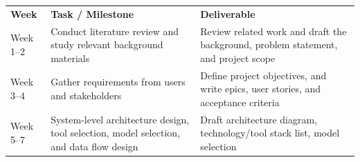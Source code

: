 \documentclass[12pt]{article}
\begin{document}
{\def\LTcaptype{none} %
\begin{longtable}[]{@{}
  >{\raggedright\arraybackslash}p{}
  >{\raggedright\arraybackslash}p{}
  >{\raggedright\arraybackslash}p{}@{}}
\toprule\noalign{}
\begin{minipage}[b]{\linewidth}\centering
\textbf{Week}
\end{minipage} & \begin{minipage}[b]{\linewidth}\centering
\textbf{Task / Milestone}
\end{minipage} & \begin{minipage}[b]{\linewidth}\centering
\textbf{Deliverable}
\end{minipage} \\
\begin{minipage}[b]{\linewidth}\centering
Week 1--2
\end{minipage} & \begin{minipage}[b]{\linewidth}\centering
Conduct literature review and study relevant background materials
\end{minipage} & \begin{minipage}[b]{\linewidth}\centering
Review related work and draft the background, problem statement, and
project scope
\end{minipage} \\
\begin{minipage}[b]{\linewidth}\centering
Week 3--4
\end{minipage} & \begin{minipage}[b]{\linewidth}\centering
Gather requirements from users and stakeholders
\end{minipage} & \begin{minipage}[b]{\linewidth}\centering
Define project objectives, and write epics, user stories, and acceptance
criteria
\end{minipage} \\
\begin{minipage}[b]{\linewidth}\centering
Week 5--7
\end{minipage} & \begin{minipage}[b]{\linewidth}\centering
System-level architecture design, tool selection, model selection, and
data flow design
\end{minipage} & \begin{minipage}[b]{\linewidth}\centering
Draft architecture diagram, technology/tool stack list, model selection

\end{minipage}
\end{longtable}}
\end{document}
